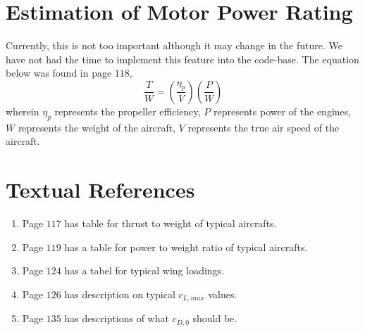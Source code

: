 \documentclass[letter, 12pt]{article}
\begin{document}
\begin{center}
\section{Estimation of Motor Power Rating}
\begin{comment}
\end{comment}
Currently, this is not too important although it may change in the future. We have not had the time to implement this feature into the code-base.
The equation below was found in page $118$,
$$\frac{T}{W} = \left(\frac{\eta_{p}}{V}\right)\left(\frac{P}{W}\right)$$
wherein $\eta_{p}$ represents the propeller efficiency, 
$P$ represents power of the engines, $W$ represents the weight of the aircraft,
$V$ represents the true air speed of the aircraft.

\section{Textual References}
\begin{comment}
\end{comment}
\begin{enumerate}
\item Page $117$ has table for thrust to weight of typical aircrafts.
\item Page $119$ has a table for power to weight ratio of typical aircrafts.
\item Page $124$ has a tabel for typical wing loadings.
\item Page $126$ has description on typical $c_{L,max}$ values.
\item Page $135$ has descriptions of what $c_{D,0}$ should be.
\end{enumerate}

\begin{comment}
Take-off distance is shown in this equation for a propeller (Page $130$)
$$\frac{W}{S} = T_{op} \sigma c_{L,TO}(hp/W)$$
wherein $T_{op}$ represents
$\sigma$ represents the density ratio. This is basically just the air density $\rho$ at takeoff altitude divided by sea-level density
$c_{L,TO}$ represents the take-off lift coefficient. This is the maximum lift coefficient divided by $1.21 = 1.1^{2}$. This is because the aircraft takes off at around $1.1$ of its stall speed.
$hp$ represents 
$W$ represents take-off weight of the aircraft
\end{comment}


\end{center}
\end{document}
